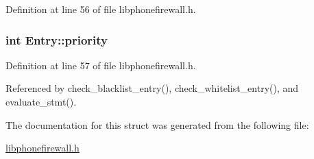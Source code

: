Definition at line 56 of file libphonefirewall.h.\hypertarget{structEntry_85af261b3171c257892b54a7200da061}{
\subsubsection{\setlength{\rightskip}{0pt plus 5cm}int {\bf Entry::priority}}}
\label{structEntry_85af261b3171c257892b54a7200da061}




Definition at line 57 of file libphonefirewall.h.

Referenced by check\_\-blacklist\_\-entry(), check\_\-whitelist\_\-entry(), and evaluate\_\-stmt().

The documentation for this struct was generated from the following file:\begin{CompactItemize}
\item 
\hyperlink{libphonefirewall_8h}{libphonefirewall.h}\end{CompactItemize}
